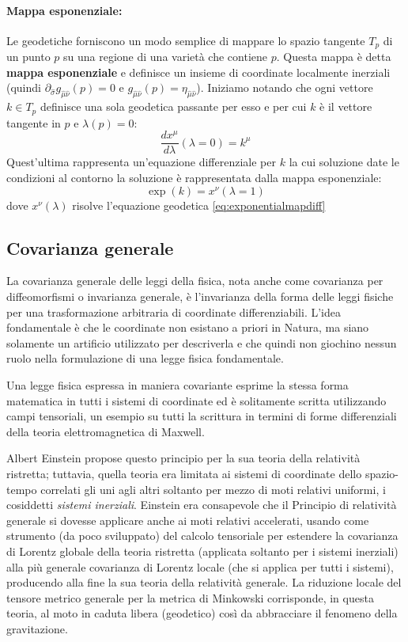 \documentclass[twoside]{article}
\begin{document}
\paragraph{Mappa esponenziale:} Le geodetiche forniscono un modo semplice di mappare lo spazio tangente $T_p$ di un punto $p$ su una regione di una varietà che contiene $p$. Questa mappa è detta \textbf{mappa esponenziale} e definisce un insieme di coordinate localmente inerziali (quindi $\partial_{\hat{\sigma}}g_{\hat{\mu}\hat{\nu}}(p)=0$ e $g_{\hat{\mu}\hat{\nu}}(p)=\eta_{\hat{\mu}\hat{\nu}}$). Iniziamo notando che ogni vettore $k\in T_p$ definisce una sola geodetica passante per esso e per cui $k$ è il vettore tangente in $p$ e $\lambda(p)=0$:
\begin{equation}\label{eq:exponentialmapdiff}
	\frac{dx^\mu}{d\lambda}(\lambda=0)=k^\mu
\end{equation}
Quest'ultima rappresenta un'equazione differenziale per $k$ la cui soluzione date le condizioni al contorno la soluzione è rappresentata dalla mappa esponenziale:
\begin{equation}
	\exp{(k)}=x^\nu(\lambda=1)
\end{equation}
dove $x^\nu(\lambda)$  risolve l'equazione geodetica \ref{eq:exponentialmapdiff}

\subsection{Covarianza generale}
La covarianza generale delle leggi della fisica, nota anche come covarianza per diffeomorfismi o invarianza generale, è l'invarianza della forma delle leggi fisiche per una trasformazione arbitraria di coordinate differenziabili. L'idea fondamentale è che le coordinate non esistano a priori in Natura, ma siano solamente un artificio utilizzato per descriverla e che quindi non giochino nessun ruolo nella formulazione di una legge fisica fondamentale. 

Una legge fisica espressa in maniera covariante esprime la stessa forma matematica in tutti i sistemi di coordinate ed è solitamente scritta utilizzando campi tensoriali, un esempio su tutti la scrittura in termini di forme differenziali della teoria elettromagnetica di Maxwell.

Albert Einstein propose questo principio per la sua teoria della relatività ristretta; tuttavia, quella teoria era limitata ai sistemi di coordinate dello spazio-tempo correlati gli uni agli altri soltanto per mezzo di moti relativi uniformi, i cosiddetti \emph{sistemi inerziali}. Einstein era consapevole che il Principio di relatività generale si dovesse applicare anche ai moti relativi accelerati, usando come strumento (da poco sviluppato) del calcolo tensoriale per estendere la covarianza di Lorentz globale della teoria ristretta (applicata soltanto per i sistemi inerziali) alla più generale covarianza di Lorentz locale (che si applica per tutti i sistemi), producendo alla fine la sua teoria della relatività generale.
La riduzione locale del tensore metrico generale per la metrica di Minkowski corrisponde, in questa teoria, al moto in caduta libera (geodetico) così da abbracciare il fenomeno della gravitazione.
\end{document}
